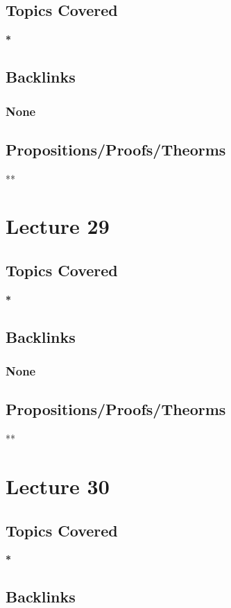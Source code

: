 \documentclass[11pt]{article}
\begin{document}
\subsection*{Topics Covered}
\label{sec:orgf8ee15a}
\textbf{*}
\subsection*{Backlinks}
\label{sec:org8179e98}
\subsubsection*{None}
\label{sec:orgda2903b}
\subsection*{Propositions/Proofs/Theorms}
\label{sec:orgaf6e32a}
**

\section*{Lecture 29}
\label{sec:org777967c}
\subsection*{Topics Covered}
\label{sec:org0d02d03}
\textbf{*}
\subsection*{Backlinks}
\label{sec:orgba39f43}
\subsubsection*{None}
\label{sec:org700a246}
\subsection*{Propositions/Proofs/Theorms}
\label{sec:org53935d6}
**

\section*{Lecture 30}
\label{sec:org1bfd639}
\subsection*{Topics Covered}
\label{sec:orgcea17f9}
\textbf{*}
\subsection*{Backlinks}
\label{sec:orgdbc257a}
\end{document}

